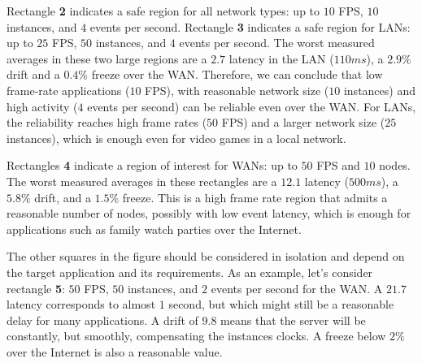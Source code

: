 \documentclass[sigplan,screen]{acmart}
\begin{document}
Rectangle \textbf{2} indicates a safe region for all network types: up to $10$
FPS, $10$ instances, and $4$ events per second.
%
Rectangle \textbf{3} indicates a safe region for LANs: up to $25$ FPS, $50$
instances, and $4$ events per second.
%
The worst measured averages in these two large regions are
    a $2.7$ latency in the LAN ($110ms$),
    a $2.9\%$ drift and
    a $0.4\%$ freeze over the WAN.
%
Therefore, we can conclude that low frame-rate applications ($10$ FPS), with
reasonable network size ($10$ instances) and high activity ($4$ events per
second) can be reliable even over the WAN.
For LANs, the reliability reaches high frame rates ($50$ FPS) and a larger
network size ($25$ instances), which is enough even for video games in a local
network.

Rectangles \textbf{4} indicate a region of interest for WANs: up to $50$ FPS
and $10$ nodes.
The worst measured averages in these rectangles are
    a $12.1$ latency ($500ms$),
    a $5.8\%$ drift, and
    a $1.5\%$ freeze.
This is a high frame rate region that admits a reasonable number of nodes,
possibly with low event latency, which is enough for applications such as
family watch parties over the Internet.

The other squares in the figure should be considered in isolation and depend on
the target application and its requirements.
%
As an example, let's consider rectangle \textbf{5}: $50$ FPS, $50$ instances,
and $2$ events per second for the WAN.
A $21.7$ latency corresponds to almost $1$ second, but which might still be a
reasonable delay for many applications.
A drift of $9.8$ means that the server will be constantly, but smoothly,
compensating the instances clocks.
A freeze below $2\%$ over the Internet is also a reasonable value.

\end{document}
